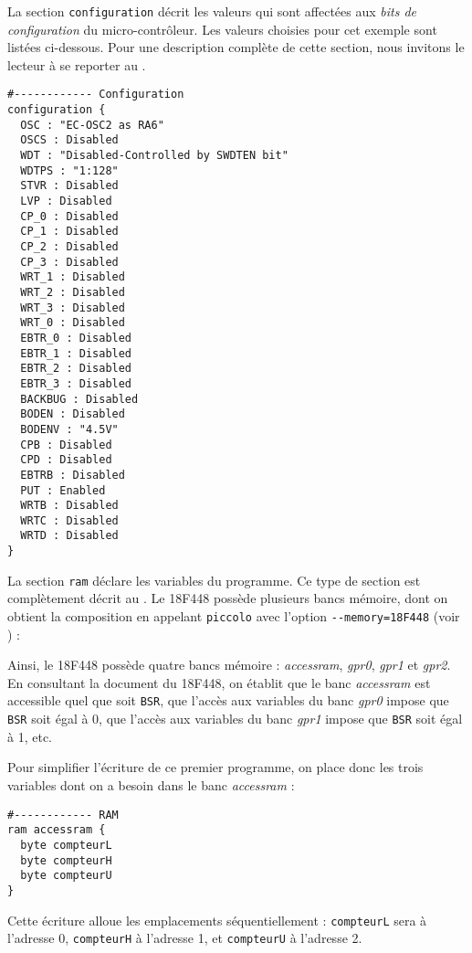 La section \texttt{configuration} décrit les valeurs qui sont affectées aux \emph{bits de configuration} du micro-contrôleur. Les valeurs choisies pour cet exemple sont listées ci-dessous. Pour une description complète de cette section, nous invitons le lecteur à se reporter au .
\begin{lstlisting}[language=piccolo]
#------------ Configuration
configuration {
  OSC : "EC-OSC2 as RA6"
  OSCS : Disabled
  WDT : "Disabled-Controlled by SWDTEN bit"
  WDTPS : "1:128"
  STVR : Disabled
  LVP : Disabled
  CP_0 : Disabled
  CP_1 : Disabled
  CP_2 : Disabled
  CP_3 : Disabled
  WRT_1 : Disabled
  WRT_2 : Disabled
  WRT_3 : Disabled
  WRT_0 : Disabled
  EBTR_0 : Disabled
  EBTR_1 : Disabled
  EBTR_2 : Disabled
  EBTR_3 : Disabled
  BACKBUG : Disabled
  BODEN : Disabled
  BODENV : "4.5V"
  CPB : Disabled
  CPD : Disabled
  EBTRB : Disabled
  PUT : Enabled
  WRTB : Disabled
  WRTC : Disabled
  WRTD : Disabled
}
\end{lstlisting}

La section \texttt{ram} déclare les variables du programme. Ce type de section est complètement décrit au . Le 18F448 possède plusieurs bancs mémoire, dont on obtient la composition en appelant \texttt{piccolo} avec l'option \texttt{-{}-memory=18F448} (voir ) :
{\footnotesize }

Ainsi, le 18F448 possède quatre bancs mémoire : \emph{accessram}, \emph{gpr0}, \emph{gpr1} et \emph{gpr2}. En consultant la document du 18F448, on établit que le banc \emph{accessram} est accessible quel que soit \texttt{BSR}, que l'accès aux variables du banc \emph{gpr0} impose que \texttt{BSR} soit égal à 0, que l'accès aux variables du banc \emph{gpr1} impose que \texttt{BSR} soit égal à 1, etc.

Pour simplifier l'écriture de ce premier programme, on place donc les trois variables dont on a besoin dans le banc \emph{accessram} :
\begin{lstlisting}[language=piccolo]
#------------ RAM
ram accessram {
  byte compteurL
  byte compteurH
  byte compteurU
}
\end{lstlisting}

Cette écriture alloue les emplacements séquentiellement : \texttt{compteurL} sera à l'adresse 0, \texttt{compteurH} à l'adresse 1, et \texttt{compteurU} à l'adresse 2.

